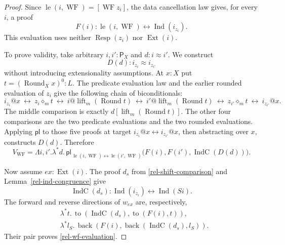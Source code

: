 \begin{proof}
Since $\operatorname{le}(i,\operatorname{WF})=[\operatorname{WF}z_i]$,
the data cancellation law gives, for every $i$, a proof
\[
 F(i):\operatorname{le}(i,\operatorname{WF})
                   \leftrightarrow\operatorname{Ind}(i_{z_i}).
\]
This evaluation uses neither $\operatorname{Resp}(z_i)$ nor
$\operatorname{Ext}(i)$.

To prove validity, take arbitrary $i,i':\mathsf P_X$ and
$d:i\approx i'$.  We construct
\[
 D(d):i_{z_i}\approx i_{z_{i'}}
\]
without introducing extensionality assumptions.  At $x:X$ put
$t=(\operatorname{Round}_Xx)^0:L$.  The predicate evaluation law
and the earlier rounded evaluation of $z_i$ give the following
chain of biconditionals:
\[
 i_{z_i}@x
 \ \leftrightarrow\ z_i\diamond_m t
 \ \leftrightarrow\ i@\operatorname{lift}_m(\operatorname{Round}t)
 \ \leftrightarrow\ i'@\operatorname{lift}_m(\operatorname{Round}t)
 \ \leftrightarrow\ z_{i'}\diamond_m t
 \ \leftrightarrow\ i_{z_{i'}}@x.
\]
The middle comparison is exactly
$d[\operatorname{lift}_m(\operatorname{Round}t)]$.
The other four comparisons are the two predicate evaluations and
the two rounded evaluations.  Applying $\mathsf{pl}$ to those five
proofs at target $i_{z_i}@x\leftrightarrow i_{z_{i'}}@x$, then
abstracting over $x$, constructs $D(d)$.  Therefore
\[
 V_{\operatorname{WF}}=
 \Lambda i,i'.\lambda^*d.\,
 \mathsf{pl}_{\,\operatorname{le}(i,\operatorname{WF})
                   \leftrightarrow
                   \operatorname{le}(i',\operatorname{WF})}
 \bigl(F(i),F(i'),\operatorname{IndC}(D(d))\bigr).
\]

Now assume $ex:\operatorname{Ext}(i)$.  The proof $d_s$ from
\eqref{rel-shift-comparison} and Lemma~\ref{rel-ind-congruence} give
\[
 \operatorname{IndC}(d_s):
          \operatorname{Ind}(i_{z_i})\leftrightarrow\operatorname{Ind}(Si).
\]
The forward and reverse directions of $w_{ex}$ are, respectively,
\begin{align*}
 &\lambda^*t.\,
   \operatorname{to}(\operatorname{IndC}(d_s),
                     \operatorname{to}(F(i),t)),\\
 &\lambda^*l_S.\,
   \operatorname{back}(F(i),
                       \operatorname{back}(\operatorname{IndC}(d_s),l_S)).
\end{align*}
Their pair proves \eqref{rel-wf-evaluation}.


\end{proof}
